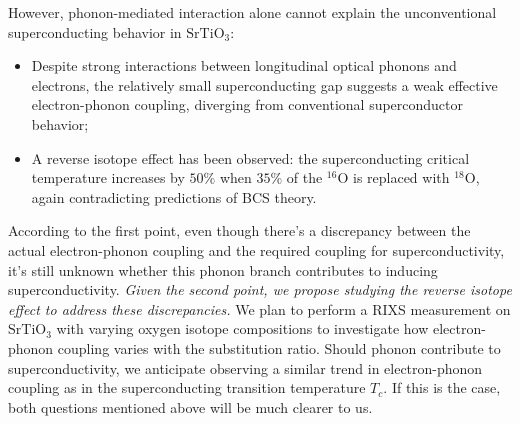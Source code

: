 \documentclass[11pt]{article}
\begin{document}
However, phonon-mediated interaction alone cannot explain the unconventional superconducting behavior in $\mathrm{SrTiO_{3}}$:
\begin{itemize}
  \item Despite strong interactions between longitudinal optical phonons and electrons, the relatively small superconducting gap suggests a weak effective electron-phonon coupling, diverging from conventional superconductor behavior; 
  \item A reverse isotope effect has been observed: the superconducting critical temperature increases by $50\%$  when $35\%$ of the ${}^{16}\mathrm{O}$ is replaced with ${}^{18}\mathrm{O}$\cite{stucky_isotope_2016}, again contradicting predictions of BCS theory.
\end{itemize}
According to the first point, even though there's a discrepancy between the actual electron-phonon coupling and the required coupling for superconductivity, it's still unknown whether this phonon branch contributes to inducing superconductivity. \textit{Given the second point, we propose studying the reverse isotope effect to address these discrepancies.} We plan to perform a RIXS measurement on $\mathrm{SrTiO_{3}}$ with varying oxygen isotope compositions to investigate how electron-phonon coupling varies with the substitution ratio.  Should phonon contribute to superconductivity, we anticipate observing a similar trend in electron-phonon coupling as in the superconducting transition temperature $T_{c}$. If this is the case, both questions mentioned above will be much clearer to us. 
\end{document}
